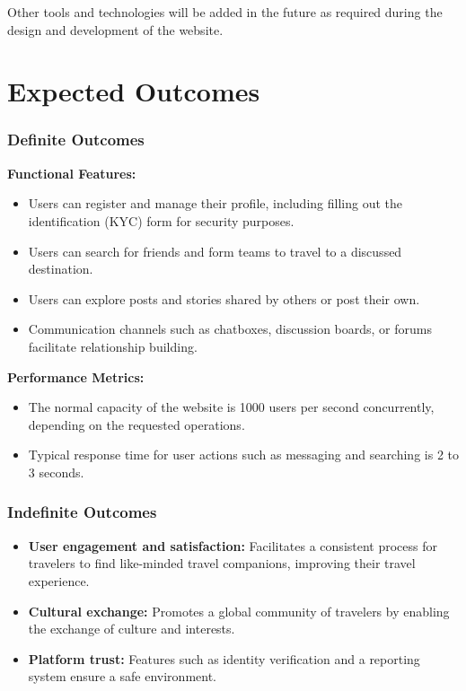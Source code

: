 \documentclass[12pt,a4paper]{report}
\begin{document}
Other tools and technologies will be added in the future as required during the design and development of the website.

\chapter{Expected Outcomes}

\subsection*{Definite Outcomes}

\textbf{Functional Features:}
\begin{itemize}
    \item Users can register and manage their profile, including filling out the identification (KYC) form for security purposes.
    \item Users can search for friends and form teams to travel to a discussed destination.
    \item Users can explore posts and stories shared by others or post their own.
    \item Communication channels such as chatboxes, discussion boards, or forums facilitate relationship building.
\end{itemize}

\textbf{Performance Metrics:}
\begin{itemize}
    \item The normal capacity of the website is 1000 users per second concurrently, depending on the requested operations.
    \item Typical response time for user actions such as messaging and searching is 2 to 3 seconds.
\end{itemize}

\subsection{Indefinite Outcomes}
\begin{itemize}
    \item \textbf{User engagement and satisfaction:} Facilitates a consistent process for travelers to find like-minded travel companions, improving their travel experience.
    \item \textbf{Cultural exchange:} Promotes a global community of travelers by enabling the exchange of culture and interests.
    \item \textbf{Platform trust:} Features such as identity verification and a reporting system ensure a safe environment.
\end{itemize}
\end{document}
